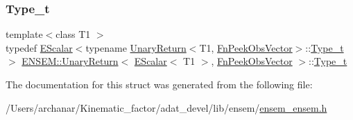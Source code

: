 \subsubsection{\texorpdfstring{Type\_t}{Type\_t}\hspace{0.1cm}{\footnotesize\ttfamily [2/2]}}
{\footnotesize\ttfamily template$<$class T1 $>$ \\
typedef \mbox{\hyperlink{classENSEM_1_1EScalar}{E\+Scalar}}$<$typename \mbox{\hyperlink{structENSEM_1_1UnaryReturn}{Unary\+Return}}$<$T1, \mbox{\hyperlink{structENSEM_1_1FnPeekObsVector}{Fn\+Peek\+Obs\+Vector}}$>$\+::\mbox{\hyperlink{structENSEM_1_1UnaryReturn_3_01EScalar_3_01T1_01_4_00_01FnPeekObsVector_01_4_ab344f63bc162dc2012f97d027b589de9}{Type\+\_\+t}}$>$ \mbox{\hyperlink{structENSEM_1_1UnaryReturn}{E\+N\+S\+E\+M\+::\+Unary\+Return}}$<$ \mbox{\hyperlink{classENSEM_1_1EScalar}{E\+Scalar}}$<$ T1 $>$, \mbox{\hyperlink{structENSEM_1_1FnPeekObsVector}{Fn\+Peek\+Obs\+Vector}} $>$\+::\mbox{\hyperlink{structENSEM_1_1UnaryReturn_3_01EScalar_3_01T1_01_4_00_01FnPeekObsVector_01_4_ab344f63bc162dc2012f97d027b589de9}{Type\+\_\+t}}}



The documentation for this struct was generated from the following file\+:\begin{DoxyCompactItemize}
\item 
/\+Users/archanar/\+Kinematic\+\_\+factor/adat\+\_\+devel/lib/ensem/\mbox{\hyperlink{lib_2ensem_2ensem__ensem_8h}{ensem\+\_\+ensem.\+h}}\end{DoxyCompactItemize}
